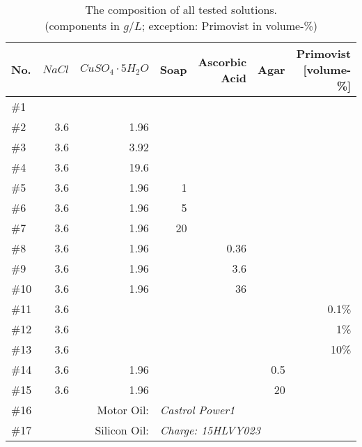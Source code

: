 \begin{table}[!hbt]
\centering
\begin{tabular}{@{}l|rrrrrr@{}}
No.   & $NaCl$   & $CuSO_4\cdot5H_2O$          & Soap & Ascorbic Acid & Agar & Primovist [volume-\%]\\
\toprule
\#1  &             &                   &      &               &           &		\\
\#2  & 3.6         & 1.96              &      &               &           &		\\
\#3  & 3.6         & 3.92              &      &               &           &		\\
\#4  & 3.6         & 19.6              &      &               &           &		\\
\#5  & 3.6         & 1.96              & 1    &               &           &		\\
\#6  & 3.6         & 1.96              & 5    &               &           &		\\
\#7  & 3.6         & 1.96              & 20   &               &           &		\\
\#8  & 3.6         & 1.96              &      & 0.36          &           &		\\
\#9  & 3.6         & 1.96              &      & 3.6           &           &		\\
\#10 & 3.6         & 1.96              &      & 36            &           &		\\
\#11 & 3.6         &                   &      &               &           & 0.1\%	\\
\#12 & 3.6         &                   &      &               &           & 1\%		\\
\#13 & 3.6         &                   &      &               &           & 10\%	\\
\#14 & 3.6         & 1.96              &      &               &  0.5      &		\\
\#15 & 3.6         & 1.96              &      &               &   20      &		\\
\midrule
\#16 & \multicolumn{2}{r}{Motor Oil:}   & \multicolumn{4}{l}{\textit{Castrol Power1}}      \\
\#17 & \multicolumn{2}{r}{Silicon Oil:} & \multicolumn{4}{l}{\textit{Charge: 15HLVY023}}   \\ \bottomrule
\end{tabular}
\caption{The composition of all tested solutions.\\(components in $g/L$; exception: Primovist in volume-\%)}
\label{tab:solutions}
\end{table}


